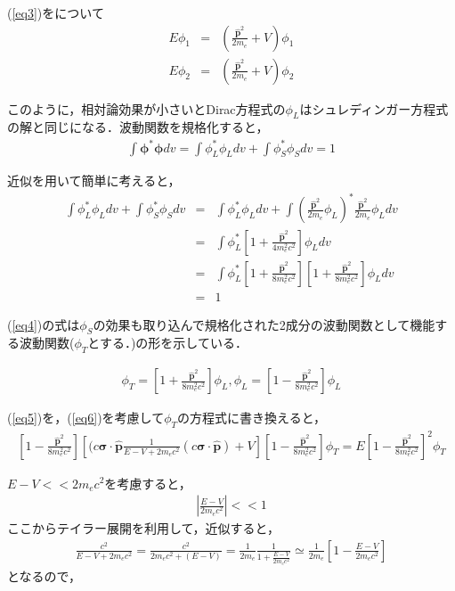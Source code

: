 \documentclass[10pt]{ujarticle}
\begin{document}
(\ref{eq3})をについて
\begin{eqnarray}
  E\phi_1 &=& \left( \frac{\bm{\hat{p}}^2}{2m_e} + V \right) \phi_1 \\
  E\phi_2 &=& \left( \frac{\bm{\hat{p}}^2}{2m_e} + V \right) \phi_2
\end{eqnarray}

このように，相対論効果が小さいとDirac方程式の$\phi_L$はシュレディンガー方程式の解と同じになる．波動関数を規格化すると，
\begin{eqnarray*}
  \int \bm{\phi}^* \bm{\phi} dv = \int \phi_L^* \phi_L dv + \int \phi_S^* \phi_S dv = 1
\end{eqnarray*}

近似を用いて簡単に考えると，
\begin{eqnarray}
\label{eq4}
  \int \phi_L^* \phi_L dv + \int \phi_S^* \phi_S dv &=& \int \phi_L^* \phi_L dv + \int \left( \frac{\bm{\hat{p}}^2}{2m_e} \phi_L \right) ^*\frac{\bm{\hat{p}}^2}{2m_e} \phi_L dv \nonumber \\
  &=& \int \phi_L^* \left[ 1+ \frac{\bm{\hat{p}}^2}{4m_e^2 c^2} \right] \phi_L dv \nonumber \\
  &=& \int \phi_L^* \left[ 1+ \frac{\bm{\hat{p}}^2}{8m_e^2 c^2} \right] \left[ 1+ \frac{\bm{\hat{p}}^2}{8m_e^2 c^2} \right] \phi_L dv \\
  &=& 1
\end{eqnarray}

(\ref{eq4})の式は$\phi_S$の効果も取り込んで規格化された2成分の波動関数として機能する波動関数($\phi_T$とする．)の形を示している．

\begin{eqnarray}
  \label{eq6}
  \phi_T = \left[ 1+ \frac{\bm{\hat{p}}^2}{8m_e^2 c^2} \right] \phi_L, \phi_L=\left[ 1- \frac{\bm{\hat{p}}^2}{8m_e^2 c^2} \right] \phi_L
\end{eqnarray}

(\ref{eq5})を，(\ref{eq6})を考慮して$\phi_T$の方程式に書き換えると，
\begin{eqnarray}
\left[ 1- \frac{\bm{\hat{p}}^2}{8m_e^2 c^2} \right] \left[(c \bm{\sigma} \cdot \bm{\hat{p}} \frac{1}{E-V+2m_e c^2} (c\bm{\sigma} \cdot \bm{\hat{p}})+V \right] \left[ 1- \frac{\bm{\hat{p}}^2}{8m_e^2 c^2} \right] \phi_T = E \left[ 1- \frac{\bm{\hat{p}}^2}{8m_e^2 c^2} \right] ^2 \phi_T
\end{eqnarray}

$E-V<<2m_e c^2$を考慮すると，
\begin{eqnarray}
  \left| \frac{E-V}{2m_e c^2} \right| << 1 
\end{eqnarray}
ここからテイラー展開を利用して，近似すると，
\begin{eqnarray}
  \frac{c^2}{E-V+2m_e c^2} = \frac{c^2}{2m_e c^2 + (E-V)} = \frac{1}{2m_e} \frac{1}{1+\frac{E-V}{2m_e c^2}} \simeq \frac{1}{2m_e} \left[ 1- \frac{E-V}{2m_e c^2} \right]
\end{eqnarray}
となるので，
\end{document}

